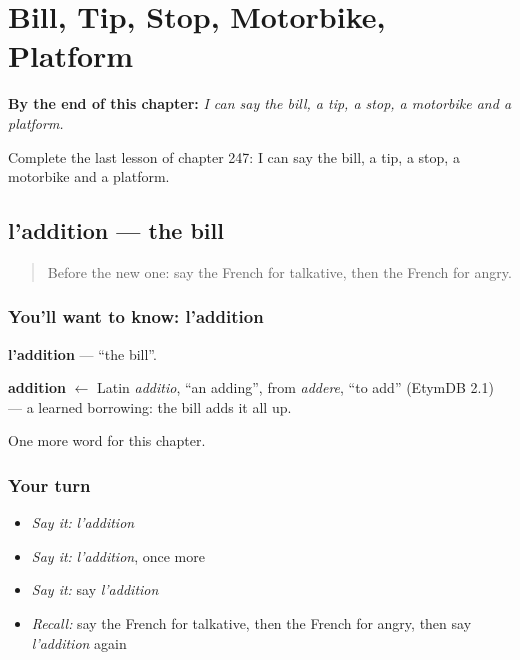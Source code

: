 
\chapter{Bill, Tip, Stop, Motorbike, Platform}
\label{ch:fr-bill-tip-stop-motorbike-platform}

\begin{chapteropening}
\textbf{By the end of this chapter:} \emph{I can say the bill, a tip, a stop, a motorbike and a platform.}

Complete the last lesson of chapter 247: I can say the bill, a tip, a stop, a motorbike and a platform.
\end{chapteropening}

\section[l'addition]{l'addition — the bill}

\label{lesson:FR-C247-addition}



\begin{quote}
Before the new one: say the French for talkative, then the French for angry.
\end{quote}

\subsection*{You'll want to know: l'addition}
\textbf{l'addition} — \textquotedblleft{}the bill\textquotedblright{}.

\begin{cousinweb}
\textbf{addition} $\leftarrow$ Latin \emph{additio}, \textquotedblleft{}an adding\textquotedblright{}, from \emph{addere}, \textquotedblleft{}to add\textquotedblright{} (EtymDB 2.1) — a learned borrowing: the bill adds it all up.
\end{cousinweb}

\begin{grammarlens}[title={What you've built}]
One more word for this chapter.
\end{grammarlens}

\subsection*{Your turn}
\begin{itemize}
\raggedright
  \item \emph{Say it:} \emph{l'addition}
  \item \emph{Say it:} \emph{l'addition}, once more
  \item \emph{Say it:} say \emph{l'addition}
  \item \emph{Recall:} say the French for talkative, then the French for angry, then say \emph{l'addition} again
\end{itemize}

